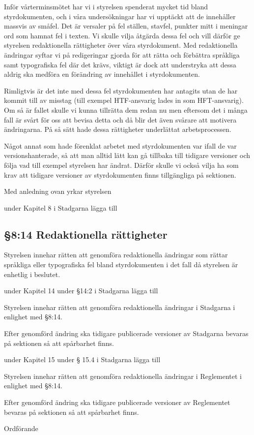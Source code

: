 \documentclass[../_main/handlingar.tex]{subfiles}
\begin{document}

Inför vårterminsmötet har vi i styrelsen spenderat mycket tid bland styrdokumenten, och i våra undersökningar har vi upptäckt att de innehåller massvis av småfel. Det är versaler på fel ställen, stavfel, punkter mitt i meningar ord som hamnat fel i texten. Vi skulle vilja åtgärda dessa fel och vill därför ge styrelsen redaktionella rättigheter över våra styrdokument. Med redaktionella ändringar syftar vi på redigeringar gjorda för att rätta och förbättra språkliga samt typografiska fel där det krävs, viktigt är dock att understryka att dessa aldrig ska medföra en förändring av innehållet i styrdokumenten.

Rimligtvis är det inte med dessa fel styrdokumenten har antagits utan de har kommit till av misstag (till exempel HTF-ansvarig lades in som HFT-ansvarig). Om så är fallet skulle vi kunna tillrätta dem redan nu men eftersom det i många fall är svårt för oss att bevisa detta och då blir det även svårare att motivera ändringarna. På så sätt hade dessa rättigheter underlättat arbetsprocessen.
 
Något annat som hade förenklat arbetet med styrdokumenten var ifall de var versionshanterade, så att man alltid lätt kan gå tillbaka till tidigare versioner och följa vad till exempel styrelsen har ändrat. Därför skulle vi också vilja ha som krav att tidigare versioner av styrdokumenten finns tillgängliga på sektionen.

Med anledning ovan yrkar styrelsen
\begin{attsatser}
    \att under Kapitel 8 i Stadgarna lägga till

    \subsection*{§8:14 Redaktionella rättigheter}
    
    Styrelsen innehar rätten att genomföra redaktionella ändringar som rättar språkliga eller typografiska fel bland styrdokumenten i det fall då styrelsen är enhetlig i beslutet. 

    \att under  Kapitel 14 under §14:2 i Stadgarna lägga till 
    
    Styrelsen innehar rätten att genomföra redaktionella ändringar i Stadgarna i enlighet med §8:14.
    
    Efter genomförd ändring ska tidigare publicerade versioner av Stadgarna bevaras på sektionen så att spårbarhet finns.


    \att under  Kapitel 15 under § 15.4 i Stadgarna lägga till 
    
    Styrelsen innehar rätten att genomföra redaktionella ändringar i Reglementet i enlighet med §8:14.
    
    Efter genomförd ändring ska tidigare publicerade versioner av Reglementet bevaras på sektionen så att spårbarhet finns.
 

\end{attsatser}

\begin{signatures}{1}
    \ist
    \signature{\ordf}{Ordförande}
\end{signatures}
\end{document}
